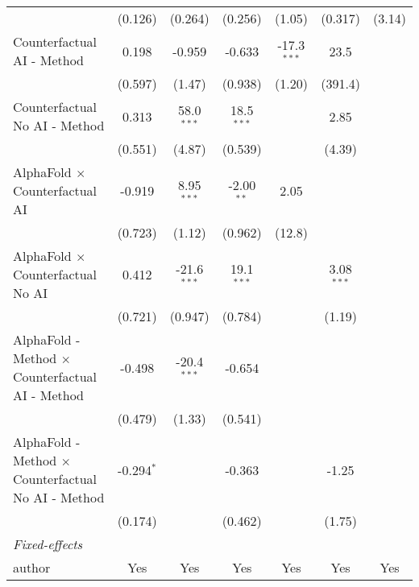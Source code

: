 \begin{tabular}{lcccccc}
                                                              & (0.126)      & (0.264)       & (0.256)      & (1.05)        & (0.317)      & (3.14)\\   
   Counterfactual AI - Method                                 & 0.198        & -0.959        & -0.633       & -17.3$^{***}$ & 23.5         &   \\   
                                                              & (0.597)      & (1.47)        & (0.938)      & (1.20)        & (391.4)      &   \\   
   Counterfactual No AI - Method                              & 0.313        & 58.0$^{***}$  & 18.5$^{***}$ &               & 2.85         &   \\   
                                                              & (0.551)      & (4.87)        & (0.539)      &               & (4.39)       &   \\   
   AlphaFold $\times$ Counterfactual AI                       & -0.919       & 8.95$^{***}$  & -2.00$^{**}$ & 2.05          &              &   \\   
                                                              & (0.723)      & (1.12)        & (0.962)      & (12.8)        &              &   \\   
   AlphaFold $\times$ Counterfactual No AI                    & 0.412        & -21.6$^{***}$ & 19.1$^{***}$ &               & 3.08$^{***}$ &   \\   
                                                              & (0.721)      & (0.947)       & (0.784)      &               & (1.19)       &   \\   
   AlphaFold - Method $\times$ Counterfactual AI - Method     & -0.498       & -20.4$^{***}$ & -0.654       &               &              &   \\   
                                                              & (0.479)      & (1.33)        & (0.541)      &               &              &   \\   
   AlphaFold - Method $\times$ Counterfactual No AI - Method  & -0.294$^{*}$ &               & -0.363       &               & -1.25        &   \\   
                                                              & (0.174)      &               & (0.462)      &               & (1.75)       &   \\   
   \midrule
   \emph{Fixed-effects}\\
   author                                                     & Yes          & Yes           & Yes          & Yes           & Yes          & Yes\\  

\end{tabular}
